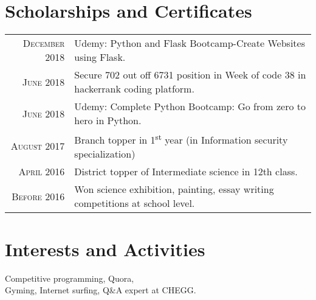 \documentclass[a4paper,10pt]{article}
\begin{document}
\section{Scholarships and Certificates}
\begin{tabular}{rl}
\textsc{December} 2018 & Udemy: Python and Flask Bootcamp-Create Websites using Flask.\\
 \textsc{June} 2018 & Secure 702 out off 6731 position in Week of code 38 in hackerrank coding platform.\\
 \textsc{June} 2018 & Udemy: Complete Python Bootcamp: Go from zero to hero in Python. \\
 \textsc{August} 2017 & Branch topper in 1\textsuperscript{st} year (in Information security specialization)\\
 \textsc{April} 2016 & District topper of Intermediate science in 12th class.\\
 \textsc{Before} 2016 & Won science exhibition, painting, essay writing competitions at school level.
 
 \normalsize\\
\end{tabular}

\section{Interests and Activities}
Competitive programming, Quora,\\Gyming, Internet surfing, Q\&A expert at CHEGG. 
\end{document}
